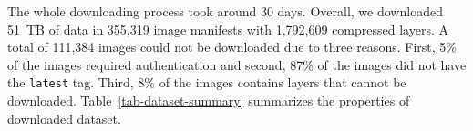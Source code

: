%
%


The whole downloading process took around 30 days.
%
Overall, we downloaded 51~TB of data in 355,319 image manifests with 1,792,609
compressed layers.
%
A total of 111,384 images could not be downloaded due to three reasons.
%
First, 5\% of the images required authentication and
second, 87\% of the images did not have the \texttt{latest} tag.
Third, 8\% of the images contains layers that cannot be downloaded.
Table~\ref{tab-dataset-summary} summarizes the properties of downloaded
dataset.







%
%


